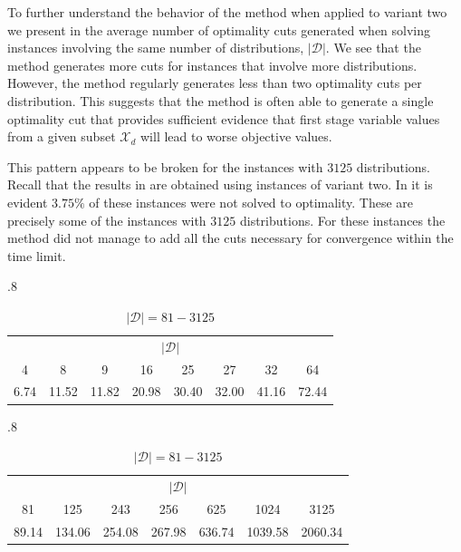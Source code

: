 \documentclass[12pt]{article}
\theoremstyle{thmstylethree}%
\newcommand{\mtc}[1] {\mathcal{#1}}
\begin{document}
To further understand the behavior of the method when applied to variant two we present in  the average number of optimality cuts generated when solving instances involving the same number of distributions, $\vert \mtc{D} \vert.$
We see that the method generates more cuts for instances that involve more distributions. However, the method regularly generates less than two optimality cuts per distribution. This suggests that the method is often able to generate a single optimality cut that provides sufficient evidence that first stage variable values from a given subset $\mtc{X}_d$ will lead to worse objective values.

This pattern appears to be broken for the instances with $3125$ distributions.
Recall that the results in  are obtained using instances of variant two.
In  it is evident $3.75\%$ of these instances were not solved to optimality.
These are precisely some of the instances with $3125$ distributions.
For these instances the method did not manage to add all the cuts necessary for convergence within the time limit.

\begin{table}[htp]
\centering
\small
\caption{Average number of optimality cuts in variant two by $\vert \mtc{D} \vert$.}
\label{tbl:num_cuts_by_d}
\begin{subtable}{.8\linewidth}
\caption{$\vert \mtc{D} \vert = 4-64$}
\begin{tabular}{|c|c|c|c|c|c|c|c|}
\hline
 \multicolumn{8}{|c|}{$\vert \mtc{D} \vert$} \\
  4 & 8 & 9 & 16 & 25 & 27 & 32 & 64 \\
\hline
 6.74 & 11.52 & 11.82 & 20.98 & 30.40 & 32.00 & 41.16 & 72.44 \\
\hline
\end{tabular}
\end{subtable}
\begin{subtable}{.8\linewidth}
\caption{$\vert \mtc{D} \vert = 81-3125$}
\begin{tabular}{|c|c|c|c|c|c|c|}
\hline
  \multicolumn{7}{|c|}{$\vert \mtc{D} \vert$} \\
  81 & 125 & 243 & 256 & 625 & 1024 & 3125 \\
\hline
89.14 & 134.06 & 254.08 & 267.98 & 636.74 & 1039.58 & 2060.34 \\
\hline
\end{tabular}
\end{subtable}
\end{table}
\end{document}
